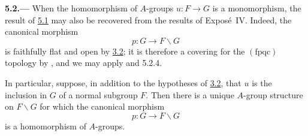 
\medskip
{}\label{par:sga3-VIA-5.2}%
\noindent\textbf{5.2.---}
When the homomorphism of \(A\)-groups \(u:F\to G\) is a
monomorphism, the result of \hyperref[par:sga3-VIA-5.1]{5.1} may also be recovered from the
results of Expos\'e~IV. Indeed, the canonical morphism
\[
  p:G\longrightarrow F\backslash G
\]
is faithfully flat and open by \hyperref[thm:sga3-VIA-3.2]{3.2}; it is therefore a covering for
the \((\mathrm{fpqc})\) topology by , and we may
apply  and 5.2.4.

In particular, suppose, in addition to the hypotheses of \hyperref[thm:sga3-VIA-3.2]{3.2}, that
\(u\) is the inclusion in \(G\) of a normal subgroup \(F\). Then
there is a unique \(A\)-group structure on \(F\backslash G\) for
which the canonical morphism
\[
  p:G\longrightarrow F\backslash G
\]
is a homomorphism of \(A\)-groups.
